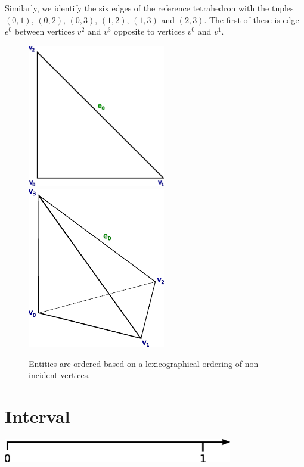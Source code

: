 Similarly, we identify the six edges of the reference tetrahedron with
the tuples $(0, 1)$, $(0, 2)$, $(0, 3)$, $(1, 2)$, $(1, 3)$ and
$(2, 3)$. The first of these is edge $e^0$ between vertices $v^2$ and
$v^3$ opposite to vertices $v^0$ and $v^1$.

\begin{figure}[H]
  \begin{center}
    \includegraphics[width=6cm]{eps/ordering_example_triangle.eps}
    \includegraphics[width=6cm]{eps/ordering_example_tetrahedron.eps}
    \caption{Entities are ordered based on a lexicographical ordering
      of non-incident vertices.}
    \label{fig:orderingexample}
  \end{center}
\end{figure}

\newpage
\section{Interval}

\includegraphics[width=10cm]{eps/interval.eps}

